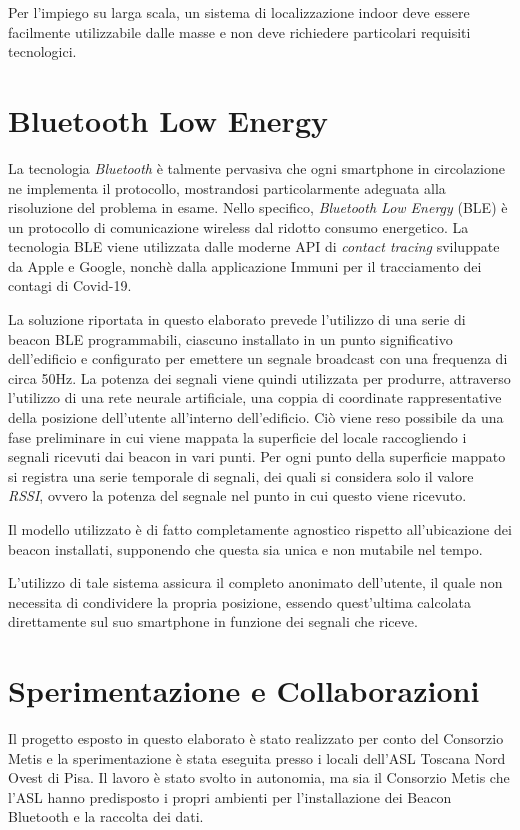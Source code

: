 \documentclass[draft]{standalone}
\begin{document}
Per l'impiego su larga scala, un sistema di localizzazione indoor deve essere
facilmente utilizzabile dalle masse e non deve richiedere particolari requisiti
tecnologici.

\section{Bluetooth Low Energy}
La tecnologia \emph{Bluetooth} è talmente pervasiva che ogni smartphone in
circolazione ne implementa il protocollo, mostrandosi particolarmente adeguata
alla risoluzione del problema in esame. Nello specifico, \emph{Bluetooth Low
  Energy} (BLE) è un protocollo di comunicazione wireless dal ridotto consumo
energetico. La tecnologia BLE viene utilizzata dalle moderne API di
\emph{contact tracing} sviluppate da Apple e Google\cite{apple-google}, nonchè
dalla applicazione Immuni\cite{immuni} per il tracciamento dei contagi di
Covid-19.

La soluzione riportata in questo elaborato prevede l'utilizzo di una serie di
beacon BLE programmabili, ciascuno installato in un punto significativo
dell'edificio e configurato per emettere un segnale broadcast con una frequenza
di circa 50Hz. La potenza dei segnali viene quindi utilizzata per produrre,
attraverso l'utilizzo di una rete neurale artificiale, una coppia di coordinate
rappresentative della posizione dell'utente all'interno dell'edificio. Ciò
viene reso possibile da una fase preliminare in cui viene mappata la superficie
del locale raccogliendo i segnali ricevuti dai beacon in vari punti. Per ogni
punto della superficie mappato si registra una serie temporale di segnali, dei
quali si considera solo il valore \emph{RSSI}, ovvero la potenza del segnale
nel punto in cui questo viene ricevuto.

Il modello utilizzato è di fatto completamente agnostico rispetto
all'ubicazione dei beacon installati, supponendo che questa sia unica e non
mutabile nel tempo.

L'utilizzo di tale sistema assicura il completo anonimato dell'utente, il quale
non necessita di condividere la propria posizione, essendo quest'ultima
calcolata direttamente sul suo smartphone in funzione dei segnali che riceve.

\section{Sperimentazione e Collaborazioni}
Il progetto esposto in questo elaborato è stato realizzato per conto del
Consorzio Metis e la sperimentazione è stata eseguita presso i locali dell'ASL
Toscana Nord Ovest di Pisa. Il lavoro è stato svolto in autonomia, ma sia il
Consorzio Metis che l'ASL hanno predisposto i propri ambienti per
l'installazione dei Beacon Bluetooth e la raccolta dei dati.
\end{document}
